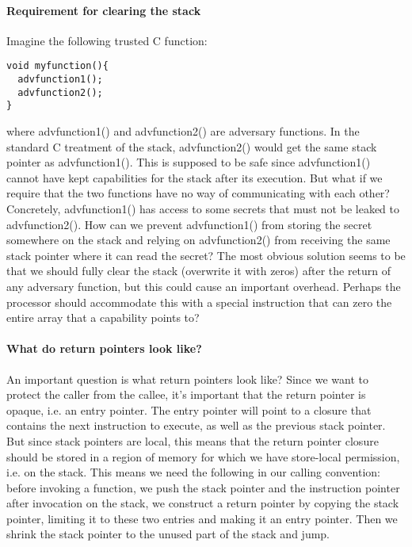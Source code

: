 \documentclass[a4paper]{article}
\begin{document}
\paragraph{Requirement for clearing the stack}
Imagine the following trusted C function:

\begin{verbatim}
void myfunction(){
  advfunction1();
  advfunction2();
}
\end{verbatim}

where advfunction1() and advfunction2() are adversary functions. In the standard
C treatment of the stack, advfunction2() would get the same stack pointer as
advfunction1(). This is supposed to be safe since advfunction1() cannot have
kept capabilities for the stack after its execution. But what if we require that
the two functions have no way of communicating with each other? Concretely,
advfunction1() has access to some secrets that must not be leaked to
advfunction2(). How can we prevent advfunction1() from storing the secret
somewhere on the stack and relying on advfunction2() from receiving the same
stack pointer where it can read the secret? The most obvious solution seems to
be that we should fully clear the stack (overwrite it with zeros) after the
return of any adversary function, but this could cause an important overhead.
Perhaps the processor should accommodate this with a special instruction that can
zero the entire array that a capability points to?

\paragraph{What do return pointers look like?}
An important question is what return pointers look like? Since we want to
protect the caller from the callee, it's important that the return pointer is
opaque, i.e. an entry pointer. The entry pointer will point to a closure that
contains the next instruction to execute, as well as the previous stack pointer.
But since stack pointers are local, this means that the return pointer closure
should be stored in a region of memory for which we have store-local permission,
i.e. on the stack. This means we need the following in our calling convention:
before invoking a function, we push the stack pointer and the instruction
pointer after invocation on the stack, we construct a return pointer by
copying the stack pointer, limiting it to these two entries and making it an
entry pointer.  Then we shrink the stack pointer to the unused part of the stack
and jump. 
\end{document}
